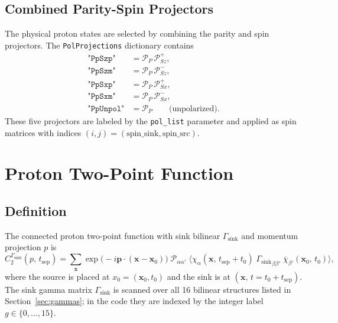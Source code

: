 \documentclass[11pt,a4paper]{article}
\newcommand{\Gsink}{\Gamma_{\text{sink}}}
\newcommand{\PolProj}{\mathcal{P}}
\newcommand{\xsrc}{x_{0}}
\begin{document}
\subsection{Combined Parity-Spin Projectors}
\label{sec:spinproj}

The physical proton states are selected by combining the parity and spin
projectors.  The \texttt{PolProjections} dictionary contains
\begin{align}
  \texttt{"PpSzp"}    &= \PolProj_{P}\,\PolProj_{Sz}^{+}, \\
  \texttt{"PpSzm"}    &= \PolProj_{P}\,\PolProj_{Sz}^{-}, \\
  \texttt{"PpSxp"}    &= \PolProj_{P}\,\PolProj_{Sx}^{+}, \\
  \texttt{"PpSxm"}    &= \PolProj_{P}\,\PolProj_{Sx}^{-}, \\
  \texttt{"PpUnpol"}  &= \PolProj_{P} \qquad\text{(unpolarized)}.
\end{align}
These five projectors are labeled by the \texttt{pol\_list} parameter and applied
as spin matrices with indices $(i,j) = (\text{spin\_sink}, \text{spin\_src})$.

\section{Proton Two-Point Function}

\subsection{Definition}

The connected proton two-point function with sink bilinear $\Gsink$ and momentum
projection $p$ is
\begin{equation}
  C_{2}^{\Gsink}(p,\,t_{\text{sep}})
  = \sum_{\mathbf{x}} \exp\!\big(-i\mathbf{p}\cdot(\mathbf{x}-\mathbf{x}_{0})\big)\;
    \PolProj_{\alpha\alpha'}\;
    \big\langle
      \chi_{\alpha}(\mathbf{x},\,t_{\text{sep}}+t_{0})\;
      {\Gsink}_{\beta\beta'}\;
      \bar{\chi}_{\beta'}(\mathbf{x}_{0},\,t_{0})
    \big\rangle,
  \label{eq:C2_def}
\end{equation}
where the source is placed at $\xsrc = (\mathbf{x}_{0}, t_{0})$ and the sink is at
$(\mathbf{x},\,t = t_{0}+t_{\text{sep}})$.  The sink gamma matrix $\Gsink$ is
scanned over all 16 bilinear structures listed in Section~\ref{sec:gammas}; in the
code they are indexed by the integer label $g \in \{0,\dots,15\}$.
\end{document}
